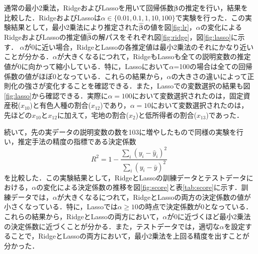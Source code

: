 \documentclass[a4paper,twocolumn]{ujarticle} %
\begin{document}
通常の最小2乗法，RidgeおよびLassoを用いて回帰係数$\bm\beta$の推定を行い，結果を比較した．RidgeおよびLassoは$\alpha \in \{0.01, 0.1, 1, 10, 100\}$で実験を行った．この実験結果として，最小2乗法により推定された$\hat{\bm{\beta}}$の値を図\ref{fig:lr}，$\alpha$の変化によるRidgeおよびLassoの推定値$\hat{\bm{\beta}}$の解パスをそれぞれ図\ref{fig:ridge}，図\ref{fig:lasso}に示す．
$\alpha$が0に近い場合，RidgeとLassoの各推定値は最小2乗法のそれにかなり近いことが分かる．$\alpha$が大きくなるにつれて，RidgeもLassoも全ての説明変数の推定値が0に向かって縮小している．特に，Lassoにおいて$\alpha$=100の場合は全ての回帰係数の値がほぼ0となっている．これらの結果から，$\alpha$の大きさの違いによって正則化の強さが変化することを確認できる．また，Lassoでの変数選択の結果も図\ref{fig:lasso}から確認できる．実際に$\alpha=100$において変数選択されたのは，固定資産税($x_{10}$)と有色人種の割合($x_{12}$)であり，$\alpha=10$において変数選択されたのは，先ほどの$x_{10}$と$x_{12}$に加えて，宅地の割合($x_2$)と低所得者の割合($x_{13}$)であった．

続いて，先の実データの説明変数の数を103に増やしたもので同様の実験を行い，推定手法の精度の指標である決定係数
\begin{equation}
	R^2 = 1 - \frac{\sum_{i}^{}(y_i - \hat{y}_i)^2}{\sum_{i}^{}(y_i - \bar{y})^2}
\end{equation}
を比較した．この実験結果として，RidgeとLassoの訓練データとテストデータにおける，$\alpha$の変化による決定係数の推移を図\ref{fig:score}と表\ref{tab:score}に示す．訓練データでは，$\alpha$が大きくなるにつれて，RidgeとLassoの両方の決定係数の値が小さくなっている．特に，Lassoでは$\alpha \geq 10$の時点で決定係数が0となっている．これらの結果から，RidgeとLassoの両方において，$\alpha$が0に近づくほど最小2乗法の決定係数に近づくことが分かる．また，テストデータでは，適切な$\alpha$を設定することで，RidgeとLassoの両方において，最小2乗法を上回る精度を出すことが分かった．
\end{document}
